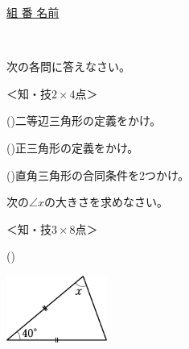 \documentclass[
  12pt,a4paper,lualatex,ja=standard]{bxjsarticle}
\begin{document}
\vspace{14mm}

\begin{center}
{\large \underline{\hspace{30mm}組 \hspace{30mm}番 \hspace{15mm} 名前 \hspace{60mm}}}
\end{center}

\newpage

　 \href{空白ページのための全角スペースあり。}{} \newpage

\pagestyle{plain}

\begin{flushleft}

\noindent{} \hspace{1pt}次の各問に答えなさい。

%
\begin{flushright}%
\footnotesize{＜知・技$2 \times 4$点＞}%
\end{flushright}%


()\hspace{2.5pt}二等辺三角形の定義をかけ。

()\hspace{2.5pt}正三角形の定義をかけ。

()\hspace{2.5pt}直角三角形の合同条件を2つかけ。

\vfill

\setcounter{skaunta}{0}

\noindent{} \hspace{1pt}次の$\angle x$の大きさを求めなさい。

%
\begin{flushright}%
\footnotesize{＜知・技$3 \times 8$点＞}%
\end{flushright}%


\begin{multicols}{2}
()\hspace{2.5pt}

\begin{center}
\def\@captype{figure}
\includegraphics[height=22mm]{media/tu1.jpg}


\end{center}
\end{multicols}
\end{flushleft}
\end{document}

